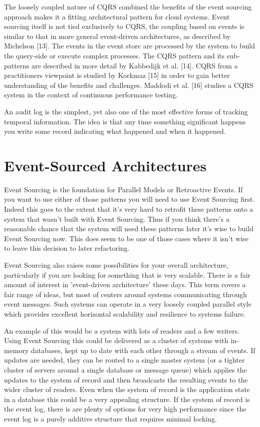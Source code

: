 The loosely coupled nature of CQRS combined the benefits of the event sourcing approach makes it a fitting architectural pattern for cloud systems. Event sourcing itself is not tied exclusively to CQRS, the coupling based on events is similar to that in more general event-driven architectures, as described by Michelson [13]. The events in the event store are processed by the system to build the query-side or execute complex processes. The CQRS pattern and its sub-patterns are described in more detail by Kabbedijk et al. [14]. CQRS from a practitioners viewpoint is studied by Korkmaz [15] in order to gain better understanding of the benefits and challenges. Maddodi et al. [16] studies a CQRS system in the context of continuous performance testing.

An audit log is the simplest, yet also one of the most effective forms of tracking temporal information. The idea is that any time something significant happens you write some record indicating what happened and when it happened.

\section{Event-Sourced Architectures}

Event Sourcing is the foundation for Parallel Models or Retroactive Events. If you want to use either of those patterns you will need to use Event Sourcing first. Indeed this goes to the extent that it's very hard to retrofit these patterns onto a system that wasn't built with Event Sourcing. Thus if you think there's a reasonable chance that the system will need these patterns later it's wise to build Event Sourcing now. This does seem to be one of those cases where it isn't wise to leave this decision to later refactoring.

Event Sourcing also raises some possibilities for your overall architecture, particularly if you are looking for something that is very scalable. There is a fair amount of interest in 'event-driven architecture' these days. This term covers a fair range of ideas, but most of centers around systems communicating through event messages. Such systems can operate in a very loosely coupled parallel style which provides excellent horizontal scalability and resilience to systems failure.

An example of this would be a system with lots of readers and a few writers. Using Event Sourcing this could be delivered as a cluster of systems with in-memory databases, kept up to date with each other through a stream of events. If updates are needed, they can be routed to a single master system (or a tighter cluster of servers around a single database or message queue) which applies the updates to the system of record and then broadcasts the resulting events to the wider cluster of readers. Even when the system of record is the application state in a database this could be a very appealing structure. If the system of record is the event log, there is are plenty of options for very high performance since the event log is a purely additive structure that requires minimal locking.

